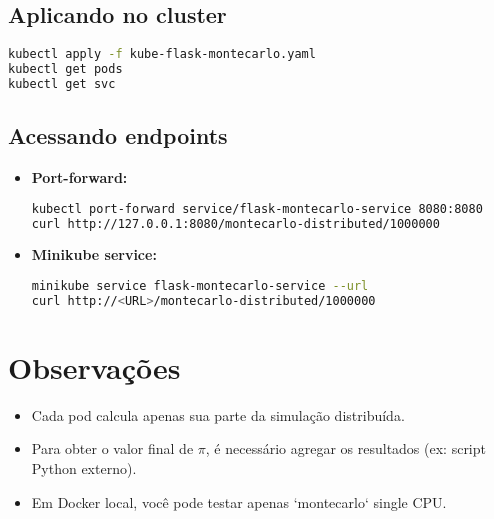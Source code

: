 \documentclass[a4paper,12pt]{article}
\begin{document}
\subsection{Aplicando no cluster}

\begin{lstlisting}[language=bash]
kubectl apply -f kube-flask-montecarlo.yaml
kubectl get pods
kubectl get svc
\end{lstlisting}

\subsection{Acessando endpoints}

\begin{itemize}
    \item \textbf{Port-forward:}
\begin{lstlisting}[language=bash]
kubectl port-forward service/flask-montecarlo-service 8080:8080
curl http://127.0.0.1:8080/montecarlo-distributed/1000000
\end{lstlisting}
    \item \textbf{Minikube service:}
\begin{lstlisting}[language=bash]
minikube service flask-montecarlo-service --url
curl http://<URL>/montecarlo-distributed/1000000
\end{lstlisting}
\end{itemize}

\section{Observações}

\begin{itemize}
    \item Cada pod calcula apenas sua parte da simulação distribuída.
    \item Para obter o valor final de $\pi$, é necessário agregar os resultados (ex: script Python externo).
    \item Em Docker local, você pode testar apenas `montecarlo` single CPU.
\end{itemize}
\end{document}
